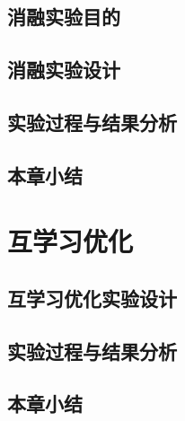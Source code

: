 \section{消融实验目的}

\section{消融实验设计}

\section{实验过程与结果分析}

\section{本章小结}

\chapter{互学习优化}

\section{互学习优化实验设计}

\section{实验过程与结果分析}

\section{本章小结}
